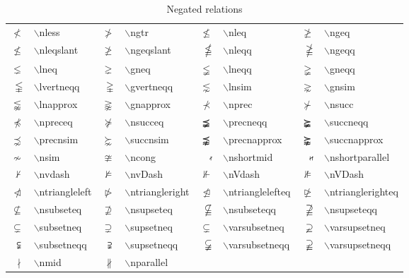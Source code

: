 \begin{table}
\centering
\caption{Negated relations}\label{tab:amsnegrel}
\vspace{\baselineskip}
\tablerule
\begin{tabular}{rlrlrlrl}
$\nless$&$\backslash$nless&
$\ngtr$&$\backslash$ngtr&
$\nleq$&$\backslash$nleq&
$\ngeq$&$\backslash$ngeq\\
$\nleqslant$&$\backslash$nleqslant&
$\ngeqslant$&$\backslash$ngeqslant&
$\nleqq$&$\backslash$nleqq&
$\ngeqq$&$\backslash$ngeqq\\
$\lneq$&$\backslash$lneq&
$\gneq$&$\backslash$gneq&
$\lneqq$&$\backslash$lneqq&
$\gneqq$&$\backslash$gneqq\\
$\lvertneqq$&$\backslash$lvertneqq&
$\gvertneqq$&$\backslash$gvertneqq&
$\lnsim$&$\backslash$lnsim&
$\gnsim$&$\backslash$gnsim\\
$\lnapprox$&$\backslash$lnapprox&
$\gnapprox$&$\backslash$gnapprox&
$\nprec$&$\backslash$nprec&
$\nsucc$&$\backslash$nsucc\\
$\npreceq$&$\backslash$npreceq&
$\nsucceq$&$\backslash$nsucceq&
$\precneqq$&$\backslash$precneqq&
$\succneqq$&$\backslash$succneqq\\
$\precnsim$&$\backslash$precnsim&
$\succnsim$&$\backslash$succnsim&
$\precnapprox$&$\backslash$precnapprox&
$\succnapprox$&$\backslash$succnapprox\\
$\nsim$&$\backslash$nsim&
$\ncong$&$\backslash$ncong&
$\nshortmid$&$\backslash$nshortmid&
$\nshortparallel$&$\backslash$nshortparallel\\
$\nvdash$&$\backslash$nvdash&
$\nvDash$&$\backslash$nvDash&
$\nVdash$&$\backslash$nVdash&
$\nVDash$&$\backslash$nVDash\\
$\ntriangleleft$&$\backslash$ntriangleleft&
$\ntriangleright$&$\backslash$ntriangleright&
$\ntrianglelefteq$&$\backslash$ntrianglelefteq&
$\ntrianglerighteq$&$\backslash$ntrianglerighteq\\
$\nsubseteq$&$\backslash$nsubseteq&
$\nsupseteq$&$\backslash$nsupseteq&
$\nsubseteqq$&$\backslash$nsubseteqq&
$\nsupseteqq$&$\backslash$nsupseteqq\\
$\subsetneq$&$\backslash$subsetneq&
$\supsetneq$&$\backslash$supsetneq&
$\varsubsetneq$&$\backslash$varsubsetneq&
$\varsupsetneq$&$\backslash$varsupsetneq\\
$\subsetneqq$&$\backslash$subsetneqq&
$\supsetneqq$&$\backslash$supsetneqq&
$\varsubsetneqq$&$\backslash$varsubsetneqq&
$\varsupsetneqq$&$\backslash$varsupsetneqq\\
$\nmid$&$\backslash$nmid&
$\nparallel$&$\backslash$nparallel&\\
\end{tabular}
\tablerule
\end{table}
